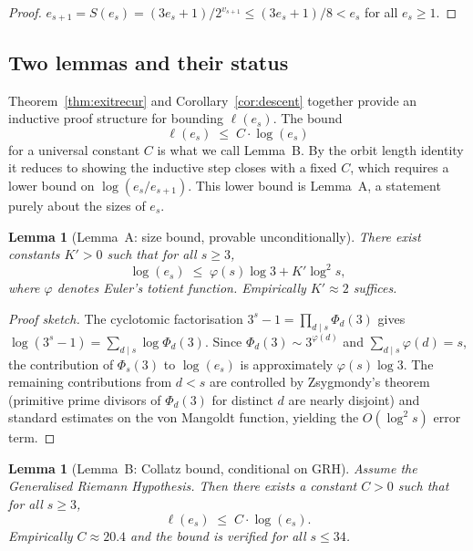 \documentclass[12pt]{amsart}
\newtheorem{lemma}[theorem]{Lemma}
\theoremstyle{definition}
\begin{document}
\begin{proof}
  $e_{s+1} = S(e_s) = (3 e_s + 1)/2^{v_{s+1}} \leq (3 e_s + 1)/8 < e_s$
  for all $e_s \geq 1$.
\end{proof}

\subsection{Two lemmas and their status}

Theorem~\ref{thm:exitrecur} and Corollary~\ref{cor:descent} together provide
an inductive proof structure for bounding $\ell(e_s)$.  The bound
\[
  \ell(e_s) \;\leq\; C \cdot \log(e_s)
\]
for a universal constant $C$ is what we call Lemma~B.  By the orbit length
identity it reduces to showing the inductive step closes with a fixed $C$,
which requires a lower bound on $\log(e_s/e_{s+1})$.  This lower bound is
Lemma~A, a statement purely about the sizes of $e_s$.

\begin{lemma}[Lemma~A: size bound, provable unconditionally]\label{lem:A}
  There exist constants $K' > 0$ such that for all $s \geq 3$,
  \[
    \log(e_s) \;\leq\; \varphi(s) \log 3 + K' \log^2 s,
  \]
  where $\varphi$ denotes Euler's totient function.
  Empirically $K' \approx 2$ suffices.
\end{lemma}

\begin{proof}[Proof sketch]
  The cyclotomic factorisation $3^s - 1 = \prod_{d \mid s} \Phi_d(3)$
  gives $\log(3^s - 1) = \sum_{d \mid s} \log \Phi_d(3)$.
  Since $\Phi_d(3) \sim 3^{\varphi(d)}$ and $\sum_{d \mid s} \varphi(d) = s$,
  the contribution of $\Phi_s(3)$ to $\log(e_s)$ is approximately
  $\varphi(s) \log 3$.  The remaining contributions from $d < s$
  are controlled by Zsygmondy's theorem (primitive prime divisors of $\Phi_d(3)$
  for distinct $d$ are nearly disjoint) and standard estimates on the von
  Mangoldt function, yielding the $O(\log^2 s)$ error term.
\end{proof}

\begin{lemma}[Lemma~B: Collatz bound, conditional on GRH]\label{lem:B}
  Assume the Generalised Riemann Hypothesis.  Then there exists a constant
  $C > 0$ such that for all $s \geq 3$,
  \[
    \ell(e_s) \;\leq\; C \cdot \log(e_s).
  \]
  Empirically $C \approx 20.4$ and the bound is verified for all $s \leq 34$.
\end{lemma}
\end{document}
